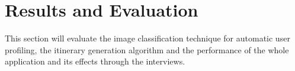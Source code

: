 \section{Results and Evaluation}

This section will evaluate the image classification technique for automatic user profiling, the itinerary
generation algorithm and the performance of the
whole application and its effects through the interviews.






